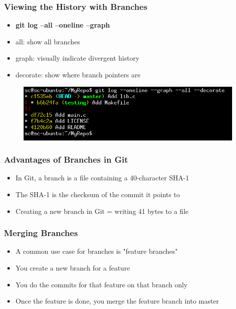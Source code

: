 \documentclass{beamer}
\begin{document}
\begin{frame}
	\frametitle{Viewing the History with Branches}
	\begin{itemize}
		\item{\textbf{git log --all --oneline --graph}}
		\item{all: show all branches}
		\item{graph: visually indicate divergent history}
		\item{decorate: show where branch pointers are}
	\end{itemize}
	\begin{figure}
		\includegraphics[scale=0.45]{Viewing_the_History_With_Branches-0.png}
	\end{figure}
\end{frame}

\begin{frame}
	\frametitle{Advantages of Branches in Git}
	\begin{itemize}
		\item{In Git, a branch is a file containing a 40-character SHA-1}
		\item{The SHA-1 is the checksum of the commit it points to}
		\item{Creating a new branch in Git = writing 41 bytes to a file}
	\end{itemize}
\end{frame}

\begin{frame}
	\frametitle{Merging Branches}
	\begin{itemize}
		\item{A common use case for branches is "feature branches"}
		\item{You create a new branch for a feature}
		\item{You do the commits for that feature on that branch only}
		\item{Once the feature is done, you merge the feature branch into master}
	\end{itemize}
\end{frame}
\end{document}
